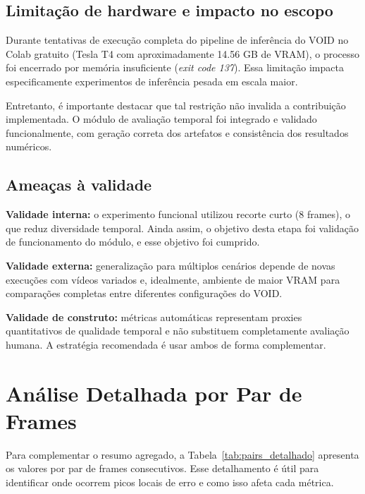 \documentclass[conference]{IEEEtran}
\begin{document}
\subsection{Limitação de hardware e impacto no escopo}
Durante tentativas de execução completa do pipeline de inferência do VOID no Colab gratuito (Tesla T4 com aproximadamente 14.56 GB de VRAM), o processo foi encerrado por memória insuficiente (\textit{exit code 137}). Essa limitação impacta especificamente experimentos de inferência pesada em escala maior.

Entretanto, é importante destacar que tal restrição não invalida a contribuição implementada. O módulo de avaliação temporal foi integrado e validado funcionalmente, com geração correta dos artefatos e consistência dos resultados numéricos.

\subsection{Ameaças à validade}
\textbf{Validade interna:}
o experimento funcional utilizou recorte curto (8 frames), o que reduz diversidade temporal. Ainda assim, o objetivo desta etapa foi validação de funcionamento do módulo, e esse objetivo foi cumprido.

\textbf{Validade externa:}
generalização para múltiplos cenários depende de novas execuções com vídeos variados e, idealmente, ambiente de maior VRAM para comparações completas entre diferentes configurações do VOID.

\textbf{Validade de construto:}
métricas automáticas representam proxies quantitativos de qualidade temporal e não substituem completamente avaliação humana. A estratégia recomendada é usar ambos de forma complementar.

\section{Análise Detalhada por Par de Frames}
Para complementar o resumo agregado, a Tabela~\ref{tab:pairs_detalhado} apresenta os valores por par de frames consecutivos. Esse detalhamento é útil para identificar onde ocorrem picos locais de erro e como isso afeta cada métrica.
\end{document}
